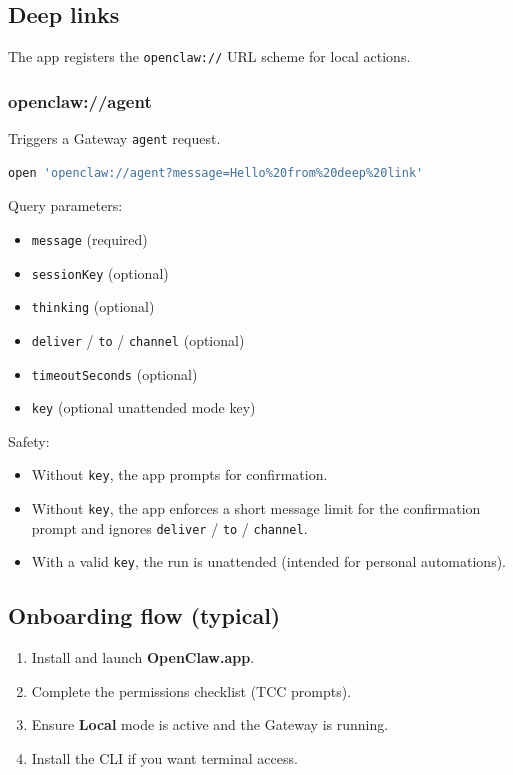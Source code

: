 \subsection{Deep links}


The app registers the \texttt{openclaw://} URL scheme for local actions.

\subsubsection{openclaw://agent}


Triggers a Gateway \texttt{agent} request.

\begin{lstlisting}[language=bash]
open 'openclaw://agent?message=Hello%20from%20deep%20link'
\end{lstlisting}


Query parameters:

\begin{itemize}
  \item \texttt{message} (required)
  \item \texttt{sessionKey} (optional)
  \item \texttt{thinking} (optional)
  \item \texttt{deliver} / \texttt{to} / \texttt{channel} (optional)
  \item \texttt{timeoutSeconds} (optional)
  \item \texttt{key} (optional unattended mode key)
\end{itemize}


Safety:

\begin{itemize}
  \item Without \texttt{key}, the app prompts for confirmation.
  \item Without \texttt{key}, the app enforces a short message limit for the confirmation prompt and ignores \texttt{deliver} / \texttt{to} / \texttt{channel}.
  \item With a valid \texttt{key}, the run is unattended (intended for personal automations).
\end{itemize}


\subsection{Onboarding flow (typical)}


\begin{enumerate}
  \item Install and launch \textbf{OpenClaw.app}.
  \item Complete the permissions checklist (TCC prompts).
  \item Ensure \textbf{Local} mode is active and the Gateway is running.
  \item Install the CLI if you want terminal access.
\end{enumerate}


